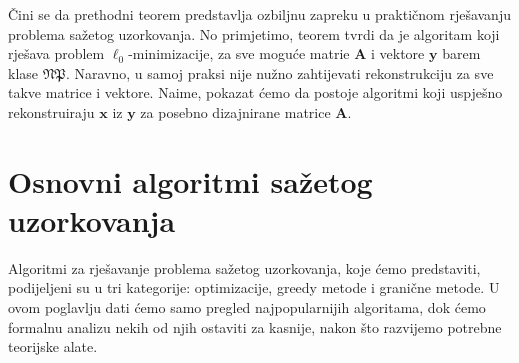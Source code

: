 \documentclass[a4paper,twoside,12pt]{memoir} %
\newcommand{\vect}[1]{\mathbf{#1}}
\renewcommand{\vec}{\vect}
\begin{document}
\v{C}ini se da prethodni teorem predstavlja ozbiljnu zapreku u prakti\v{c}nom rje\v{s}avanju problema sa\v{z}etog uzorkovanja. No primjetimo, teorem tvrdi da je algoritam koji rje\v{s}ava problem $\ell_0$-minimizacije, za sve mogu\'ce matrie $\vec A$ i vektore $\vec y$ barem klase $\mathfrak{NP}$. Naravno, u samoj praksi nije nu\v{z}no zahtijevati rekonstrukciju za sve takve matrice i vektore. Naime, pokazat \'cemo da postoje algoritmi koji uspje\v{s}no rekonstruiraju $\vec x$ iz $\vec y$ za posebno dizajnirane matrice $\vec A$.




\chapter[Osnovni algoritmi sa\v{z}etog uzorkovanja][Osnovni algoritmi sa\v{z}etog uzorkovanja]{Osnovni algoritmi sa\v{z}etog uzorkovanja}\label{chapter_algoritmi}
Algoritmi za rje\v{s}avanje problema sa\v{z}etog uzorkovanja, koje \'cemo predstaviti, podijeljeni su u tri kategorije: optimizacije, greedy metode i grani\v{c}ne metode. U ovom poglavlju dati \'cemo samo pregled najpopularnijih algoritama, dok \'cemo formalnu analizu nekih od njih ostaviti za kasnije, nakon \v{s}to razvijemo potrebne teorijske alate.
\end{document}
